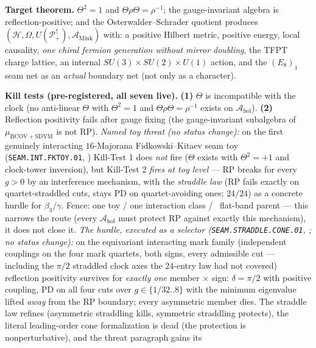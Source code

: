 \documentclass[11pt,a4paper]{article}
\begin{document}
\par\smallskip\noindent\textbf{Target theorem.} $\Theta^2=1$ and $\Theta\rho\Theta=\rho^{-1}$; the
gauge-invariant algebra is reflection-positive; and the Osterwalder--Schrader quotient produces
$(\mathcal H,\Omega,U(\mathcal P^\uparrow_+),\mathcal A_{\mathrm{Mink}})$ with: a positive Hilbert
metric, positive energy, local causality, \emph{one chiral fermion generation without mirror
doubling}, the TFPT charge lattice, an internal $SU(3){\times}SU(2){\times}U(1)$ action, and the
$(E_8)_1$ seam net as an \emph{actual} boundary net (not only as a character).

\par\smallskip\noindent\textbf{Kill tests (pre-registered, all seven live).}
\textbf{(1)} $\Theta$ is incompatible with the clock (no anti-linear $\Theta$ with $\Theta^2=1$ and
$\Theta\rho\Theta=\rho^{-1}$ exists on $\mathcal A_{\mathrm{hol}}$).
\textbf{(2)} Reflection positivity fails after gauge fixing (the gauge-invariant subalgebra of
$\mu_{\mathrm{BCOV+SDYM}}$ is not RP).
\emph{Named toy threat (no status change):} on the first genuinely interacting $16$-Majorana
Fidkowski--Kitaev seam toy (\texttt{SEAM.INT.FKTOY.01}, )
Kill-Test 1 does \emph{not} fire ($\Theta$ exists with $\Theta^2=+1$ and clock-tower inversion),
but Kill-Test 2 \emph{fires at toy level} --- RP breaks for every $g>0$ by an interference
mechanism, with the \emph{straddle law} (RP fails exactly on quartet-straddled cuts, stays PD on
quartet-avoiding ones; $24/24$) as a concrete hurdle for $\beta_3/\gamma$. Fence: one toy / one
interaction class / \mC\ flat-band parent --- this narrows the route (every $\mathcal A_{\mathrm{hol}}$
must protect RP against exactly this mechanism), it does not close it.
\emph{The hurdle, executed as a selector (\texttt{SEAM.STRADDLE.CONE.01},
; no status change):} on the equivariant interacting mark
family (independent couplings on the four mark quartets, both signs, every admissible cut ---
including the $\pi/2$ straddled clock axes the $24$-entry law had not covered) reflection
positivity survives for \emph{exactly one} member $\times$ sign: $\delta=\pi/2$ with positive
coupling, PD on all four cuts over $g\in\{1/32..8\}$ with the minimum eigenvalue lifted
\emph{away} from the RP boundary; every asymmetric member dies. The straddle law refines
(asymmetric straddling kills, symmetric straddling protects), the literal leading-order cone
formalization is dead (the protection is nonperturbative), and the threat paragraph gains its
\end{document}
